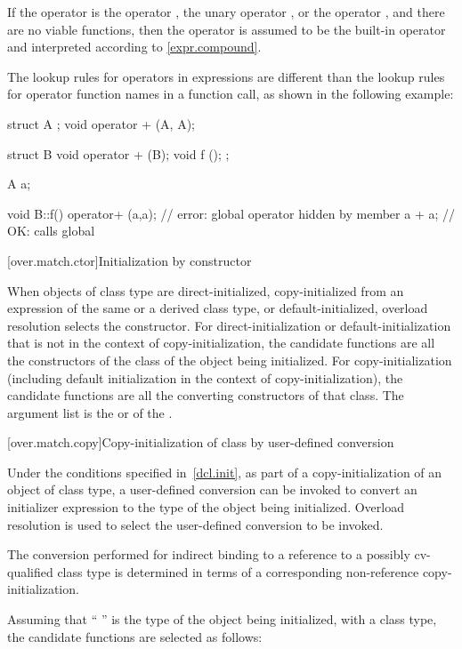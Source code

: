 \pnum
If the operator is the operator
\tcode{,},
the unary operator
\tcode{\&},
or the operator
\tcode{->},
and there are no viable functions, then the operator is
assumed to be the built-in operator and interpreted according to
\ref{expr.compound}.

\pnum
\begin{note}
The lookup rules for operators in expressions are different than
the lookup
rules for operator function names in a function call, as shown in the following
example:

\begin{codeblock}
struct A { };
void operator + (A, A);

struct B {
  void operator + (B);
  void f ();
};

A a;

void B::f() {
  operator+ (a,a);              // error: global operator hidden by member
  a + a;                        // OK: calls global 
}
\end{codeblock}
\end{note}

[over.match.ctor]{Initialization by constructor}%

\pnum
When objects of class type are direct-initialized,
copy-initialized from an expression of the same or a
derived class type,
or default-initialized,
overload resolution selects the constructor.
For direct-initialization or default-initialization
that is not in the context of copy-initialization, the
candidate functions are
all the constructors of the class of the object being
initialized.
For copy-initialization (including default initialization
in the context of copy-initialization), the candidate functions are all
the converting constructors of that
class.
The argument list is the
 or 
of the .

[over.match.copy]{Copy-initialization of class by user-defined conversion}%

\pnum
Under the conditions specified in~\ref{dcl.init}, as
part of a copy-initialization of an object of class type, a user-defined
conversion can be invoked to convert an initializer expression to the
type of the object being initialized.
Overload resolution is used
to select the user-defined conversion to be invoked.
\begin{note}
The conversion performed for indirect binding to a reference to a possibly
cv-qualified class type is determined in terms of a corresponding non-reference
copy-initialization.
\end{note}
Assuming that
`` '' is the type of the object being initialized, with
a class type,
the candidate functions are selected as follows:

